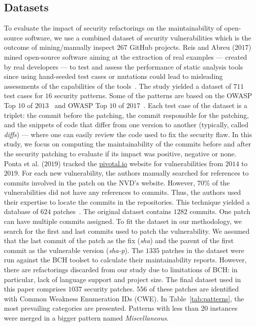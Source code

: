 \documentclass[10pt,conference]{IEEEtran}
\begin{document}
\subsection{Datasets}
%
To evaluate the impact of security refactorings on the maintainability of
open-source software, we use a combined dataset of security vulnerabilities which is 
the outcome of mining/manually inspect $267$ GitHub projects. Reis and Abreu 
($2017$) mined open-source
software aiming at the extraction of real examples --- created by real
developers --- to test and assess the performance of static analysis tools~\cite{Reis:2017:IJSSE} since
using hand-seeded test cases or mutations could lead to misleading assessments
of the capabilities of the tools~\cite{just2014mutants}. The study yielded a
dataset of $711$ test cases for $16$ security patterns. Some of the patterns
are based on the OWASP Top $10$ of $2013$~\cite{oswap:2013} and OWASP Top $10$ of
$2017$~\cite{oswap:2017}. Each test case of the
dataset is a triplet: the commit before the patching, the commit responsible
for the patching, and the snippets of code that differ from one version to
another (typically, called \textit{diffs}) --- where one can easily review the
code used to fix the security flaw. In this study, we focus on computing the
maintainability of the commits before and after the security patching to
evaluate if its impact was positive, negative or none.
%
Ponta et al. ($2019$) tracked the \url{pivotal.io} website for vulnerabilities 
from $2014$ to $2019$. For each new vulnerability, the authors manually searched 
for references to commits involved in the patch on the NVD's website. However, $70\%$
of the vulnerabilities did not have any references to commits. Thus, the authors
used their expertise to locate the commits in the repositories. This technique 
yielded a database of $624$ patches~\cite{10.1109/MSR.2019.00064}. The original 
dataset contains $1282$ commits. One patch can have multiple commits assigned.
To fit the dataset in our methodology, we search for the first and last commits
used to patch the vulnerability. We assumed that the last commit of the patch as 
the fix (\emph{sha}) and the parent of the first commit as the vulnerable version 
(\emph{sha-p}).
%
The $1335$ patches in the dataset were run against the BCH toolset to
calculate their maintainability reports. However, there are refactorings
discarded from our study due to limitations of BCH: in particular, lack of
language support and project size. The final dataset used in this paper comprises
$1037$ security patches. $556$ of these patches are identified with Common Weakness
Enumeration IDs (CWE). In Table~\ref{tab:patterns}, the most prevailing categories are presented. Patterns
with less than $20$ instances were merged in a bigger pattern named \textit{Miscellaneous}.
\end{document}
